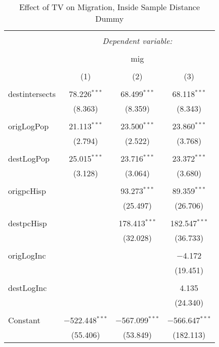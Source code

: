 
\begin{table}[!htbp] \centering 
  \caption{Effect of TV on Migration, Inside Sample Distance Dummy} 
  \label{} 
\begin{tabular}{@{\extracolsep{5pt}}lccc} 
\\[-1.8ex]\hline 
\hline \\[-1.8ex] 
 & \multicolumn{3}{c}{\textit{Dependent variable:}} \\ 
\cline{2-4} 
\\[-1.8ex] & \multicolumn{3}{c}{mig} \\ 
\\[-1.8ex] & (1) & (2) & (3)\\ 
\hline \\[-1.8ex] 
 destintersects & 78.226$^{***}$ & 68.499$^{***}$ & 68.118$^{***}$ \\ 
  & (8.363) & (8.359) & (8.343) \\ 
  & & & \\ 
 origLogPop & 21.113$^{***}$ & 23.500$^{***}$ & 23.860$^{***}$ \\ 
  & (2.794) & (2.522) & (3.768) \\ 
  & & & \\ 
 destLogPop & 25.015$^{***}$ & 23.716$^{***}$ & 23.372$^{***}$ \\ 
  & (3.128) & (3.064) & (3.680) \\ 
  & & & \\ 
 origpcHisp &  & 93.273$^{***}$ & 89.359$^{***}$ \\ 
  &  & (25.497) & (26.706) \\ 
  & & & \\ 
 destpcHisp &  & 178.413$^{***}$ & 182.547$^{***}$ \\ 
  &  & (32.028) & (36.733) \\ 
  & & & \\ 
 origLogInc &  &  & $-$4.172 \\ 
  &  &  & (19.451) \\ 
  & & & \\ 
 destLogInc &  &  & 4.135 \\ 
  &  &  & (24.340) \\ 
  & & & \\ 
 Constant & $-$522.448$^{***}$ & $-$567.099$^{***}$ & $-$566.647$^{***}$ \\ 
  & (55.406) & (53.849) & (182.113) \\ 

\end{tabular}
\end{table}
